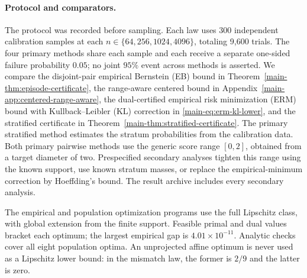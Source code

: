 \paragraph{Protocol and comparators.}
The protocol was recorded before sampling. Each law uses 300 independent
calibration samples at each $n\in\{64,256,1024,4096\}$, totaling 9,600 trials.
The four primary methods share each sample and each receive a separate
one-sided failure probability $0.05$; no joint $95\%$ event across methods
is asserted. We compare the disjoint-pair empirical Bernstein (EB) bound in
Theorem~\ref{main-thm:episode-certificate}, the range-aware centered bound in
Appendix~\ref{main-app:centered-range-aware}, the dual-certified empirical risk
minimization (ERM) bound with Kullback--Leibler (KL) correction in
\eqref{main-eq:erm-kl-lower}, and the
stratified certificate in Theorem~\ref{main-thm:stratified-certificate}.
The primary stratified method estimates the stratum probabilities from the
calibration data. Both primary pairwise methods use the generic score range
$[0,2]$, obtained from a target diameter of two.
Prespecified secondary analyses tighten this range using the known support,
use known stratum masses, or replace the empirical-minimum correction by
Hoeffding's bound. The result archive includes every secondary analysis.

The empirical and population optimization programs use the full Lipschitz
class, with global extension from the finite support. Feasible primal and dual
values bracket each optimum; the largest empirical gap is
$4.01\times10^{-11}$. Analytic checks cover all eight population optima.
An unprojected affine optimum is never used as a Lipschitz lower bound: in the
mismatch law, the former is $2/9$ and the latter is zero.

